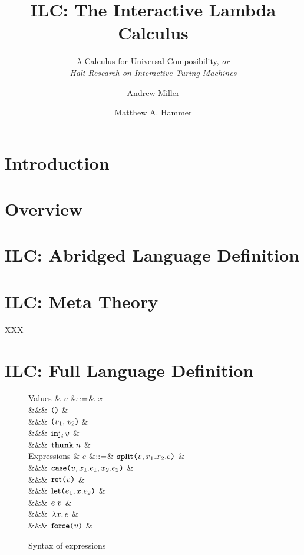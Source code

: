 \documentclass{llncs}
\title{ILC: The Interactive Lambda Calculus}
\subtitle{$\lambda$-Calculus for Universal Composibility, \emph{or}
  \\
  \emph{Halt Research on Interactive Turing Machines}
}
\author{Andrew Miller\inst{1} \and Matthew A. Hammer\inst{2}}
\institute{University of Illinois \and University of Colorado Boulder}
\begin{document}
\maketitle

\begin{abstract}

\end{abstract}

\section{Introduction}

\section{Overview}

\section{ILC: Abridged Language Definition}

\section{ILC: Meta Theory}

\begin{theorem}
\label{thm:read-det}
XXX
\end{theorem}


\appendix
\section{ILC: Full Language Definition}


\begin{figure}[htbp]
  \centering
 
\begin{grammar}
  Values
  & $v$
      &$\mathrel{::=}$&
      $x$
      \\ &&& $\bnfaltbrk \unitexp$ & 
      \\ &&& $\bnfaltbrk \Pair{v_1}{v_2}$ &
      \\ &&& $\bnfaltbrk \inj{i}{v}$ &
      \\ &&& $\bnfaltbrk \thunk{n}$ &
  \\[1ex]
  Expressions
  & $e$
      &$\mathrel{::=}$&
             $\Split{v}{x_1}{x_2}{e}$ &
      \\ &&& $\bnfaltbrk \Case{v}{x_1}{e_1}{x_2}{e_2}$ &
      \\ &&& $\bnfaltbrk \Ret{v}$ &
      \\ &&& $\bnfaltbrk \Let{e_1}{x}{e_2}$ &
      \\ &&& $\hspace{-1.02ex}\mathrel{\mid} e\;v$ &
      \\ &&& $\hspace{-1.02ex}\mathrel{\mid} \lambda x.\, e$ &
      \\ &&& $\bnfaltbrk \Force{v}$ &
\end{grammar}

  \caption{Syntax of expressions}
  \label{fig:expr}
\end{figure}
\end{document}
